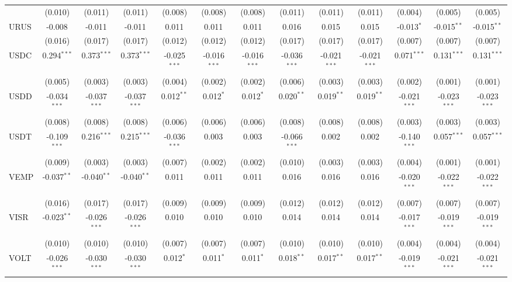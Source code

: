 \begin{table}[!htbp]
\begin{tabular}{@{\extracolsep{5pt}}lcccccccccccc}
  & (0.010) & (0.011) & (0.011) & (0.008) & (0.008) & (0.008) & (0.011) & (0.011) & (0.011) & (0.004) & (0.005) & (0.005) \\
 URUS & -0.008$^{}$ & -0.011$^{}$ & -0.011$^{}$ & 0.011$^{}$ & 0.011$^{}$ & 0.011$^{}$ & 0.016$^{}$ & 0.015$^{}$ & 0.015$^{}$ & -0.013$^{*}$ & -0.015$^{**}$ & -0.015$^{**}$ \\
  & (0.016) & (0.017) & (0.017) & (0.012) & (0.012) & (0.012) & (0.017) & (0.017) & (0.017) & (0.007) & (0.007) & (0.007) \\
 USDC & 0.294$^{***}$ & 0.373$^{***}$ & 0.373$^{***}$ & -0.025$^{***}$ & -0.016$^{***}$ & -0.016$^{***}$ & -0.036$^{***}$ & -0.021$^{***}$ & -0.021$^{***}$ & 0.071$^{***}$ & 0.131$^{***}$ & 0.131$^{***}$ \\
  & (0.005) & (0.003) & (0.003) & (0.004) & (0.002) & (0.002) & (0.006) & (0.003) & (0.003) & (0.002) & (0.001) & (0.001) \\
 USDD & -0.034$^{***}$ & -0.037$^{***}$ & -0.037$^{***}$ & 0.012$^{**}$ & 0.012$^{*}$ & 0.012$^{*}$ & 0.020$^{**}$ & 0.019$^{**}$ & 0.019$^{**}$ & -0.021$^{***}$ & -0.023$^{***}$ & -0.023$^{***}$ \\
  & (0.008) & (0.008) & (0.008) & (0.006) & (0.006) & (0.006) & (0.008) & (0.008) & (0.008) & (0.003) & (0.003) & (0.003) \\
 USDT & -0.109$^{***}$ & 0.216$^{***}$ & 0.215$^{***}$ & -0.036$^{***}$ & 0.003$^{}$ & 0.003$^{}$ & -0.066$^{***}$ & 0.002$^{}$ & 0.002$^{}$ & -0.140$^{***}$ & 0.057$^{***}$ & 0.057$^{***}$ \\
  & (0.009) & (0.003) & (0.003) & (0.007) & (0.002) & (0.002) & (0.010) & (0.003) & (0.003) & (0.004) & (0.001) & (0.001) \\
 VEMP & -0.037$^{**}$ & -0.040$^{**}$ & -0.040$^{**}$ & 0.011$^{}$ & 0.011$^{}$ & 0.011$^{}$ & 0.016$^{}$ & 0.016$^{}$ & 0.016$^{}$ & -0.020$^{***}$ & -0.022$^{***}$ & -0.022$^{***}$ \\
  & (0.016) & (0.017) & (0.017) & (0.009) & (0.009) & (0.009) & (0.012) & (0.012) & (0.012) & (0.007) & (0.007) & (0.007) \\
 VISR & -0.023$^{**}$ & -0.026$^{***}$ & -0.026$^{***}$ & 0.010$^{}$ & 0.010$^{}$ & 0.010$^{}$ & 0.014$^{}$ & 0.014$^{}$ & 0.014$^{}$ & -0.017$^{***}$ & -0.019$^{***}$ & -0.019$^{***}$ \\
  & (0.010) & (0.010) & (0.010) & (0.007) & (0.007) & (0.007) & (0.010) & (0.010) & (0.010) & (0.004) & (0.004) & (0.004) \\
 VOLT & -0.026$^{***}$ & -0.030$^{***}$ & -0.030$^{***}$ & 0.012$^{*}$ & 0.011$^{*}$ & 0.011$^{*}$ & 0.018$^{**}$ & 0.017$^{**}$ & 0.017$^{**}$ & -0.019$^{***}$ & -0.021$^{***}$ & -0.021$^{***}$ \\

\end{tabular}
\end{table}
